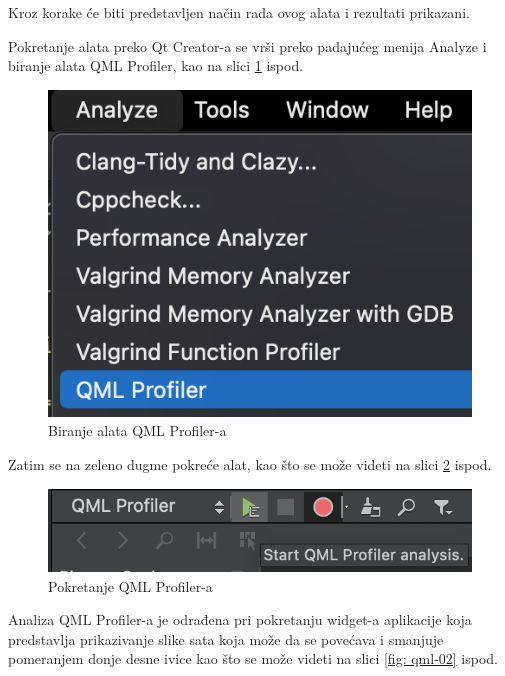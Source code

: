 \documentclass[a4paper]{article}
\begin{document}
Kroz korake će biti predstavljen način rada ovog alata i rezultati prikazani.

Pokretanje alata preko Qt Creator-a se vrši preko padajućeg menija Analyze i biranje alata QML Profiler, kao na slici \ref{fig: qml-00} ispod.

\begin{figure}[h!]
\begin{center}
\includegraphics[scale=0.45]{qml-prof-00.png}
\end{center}
\caption{Biranje alata QML Profiler-a}
\label{fig: qml-00}
\end{figure}


Zatim se na zeleno dugme pokreće alat, kao što se može videti na slici \ref{fig: qml-01} ispod.

\begin{figure}[h!]
\begin{center}
\includegraphics[scale=0.45]{qml-prof-01.png}
\end{center}
\caption{Pokretanje QML Profiler-a}
\label{fig: qml-01}
\end{figure}

Analiza QML Profiler-a je odrađena pri pokretanju widget-a aplikacije koja predstavlja prikazivanje slike sata koja može da se povećava i smanjuje pomeranjem donje desne ivice kao što se može videti na slici \ref{fig: qml-02} ispod.
\end{document}
